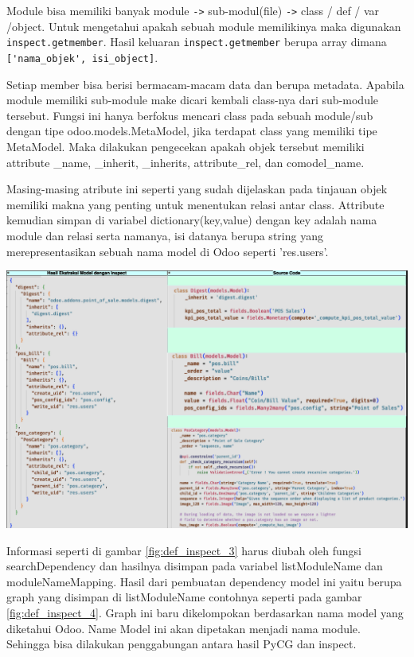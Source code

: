 Module bisa memiliki banyak module \verb|->| sub-modul(file) \verb|->| class / def / var /object. Untuk mengetahui apakah sebuah module memilikinya maka digunakan \verb|inspect.getmember|. Hasil keluaran \verb|inspect.getmember| berupa array dimana \verb|['nama_objek', isi_object]|. 

Setiap member bisa berisi bermacam-macam data dan berupa metadata. Apabila module memiliki sub-module make dicari kembali class-nya dari sub-module tersebut. Fungsi ini hanya berfokus mencari class pada sebuah module/sub dengan tipe odoo.models.MetaModel, jika terdapat class yang memiliki tipe MetaModel. Maka dilakukan pengecekan apakah objek tersebut memiliki attribute {\_}name, {\_}inherit, {\_}inherits, attribute{\_}rel, dan comodel{\_}name. 

Masing-masing atribute ini seperti yang sudah dijelaskan pada tinjauan objek memiliki makna yang penting untuk menentukan relasi antar class. Attribute kemudian simpan di variabel dictionary(key,value) dengan key adalah nama module dan relasi serta namanya, isi datanya berupa string yang merepresentasikan sebuah nama model di Odoo seperti 'res.users'. 

\begin{center}
	\includegraphics[width=14cm]{img/bab_4/def_inspect_3.png}
	\label{fig:def_inspect_3}
\end{center}

Informasi seperti di gambar \ref{fig:def_inspect_3} harus diubah oleh fungsi searchDependency dan hasilnya disimpan pada variabel listModuleName dan moduleNameMapping.
Hasil dari pembuatan dependency model ini yaitu berupa graph yang disimpan di listModuleName contohnya seperti pada gambar \ref{fig:def_inspect_4}. Graph ini baru dikelompokan berdasarkan nama model yang diketahui Odoo. Name Model ini akan dipetakan menjadi nama module. Sehingga bisa dilakukan penggabungan antara hasil PyCG dan inspect.

